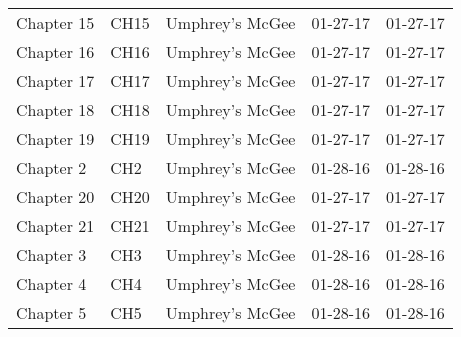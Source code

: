 \begin{longtable}{p{}p{}p{}p{}p{}}
                                                              Chapter 15 &          CH15 &                                          Umphrey's McGee &              01-27-17 &             01-27-17 \\
                                                              Chapter 16 &          CH16 &                                          Umphrey's McGee &              01-27-17 &             01-27-17 \\
                                                              Chapter 17 &          CH17 &                                          Umphrey's McGee &              01-27-17 &             01-27-17 \\
                                                              Chapter 18 &          CH18 &                                          Umphrey's McGee &              01-27-17 &             01-27-17 \\
                                                              Chapter 19 &          CH19 &                                          Umphrey's McGee &              01-27-17 &             01-27-17 \\
                                                               Chapter 2 &           CH2 &                                          Umphrey's McGee &              01-28-16 &             01-28-16 \\
                                                              Chapter 20 &          CH20 &                                          Umphrey's McGee &              01-27-17 &             01-27-17 \\
                                                              Chapter 21 &          CH21 &                                          Umphrey's McGee &              01-27-17 &             01-27-17 \\
                                                               Chapter 3 &           CH3 &                                          Umphrey's McGee &              01-28-16 &             01-28-16 \\
                                                               Chapter 4 &           CH4 &                                          Umphrey's McGee &              01-28-16 &             01-28-16 \\
                                                               Chapter 5 &           CH5 &                                          Umphrey's McGee &              01-28-16 &             01-28-16 \\

\end{longtable}
